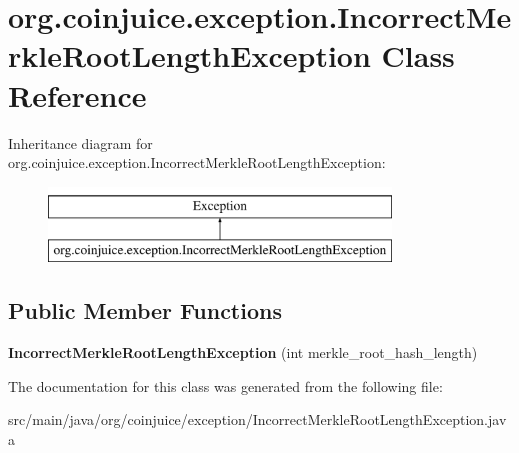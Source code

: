 \hypertarget{classorg_1_1coinjuice_1_1exception_1_1_incorrect_merkle_root_length_exception}{\section{org.\-coinjuice.\-exception.\-Incorrect\-Merkle\-Root\-Length\-Exception Class Reference}
\label{classorg_1_1coinjuice_1_1exception_1_1_incorrect_merkle_root_length_exception}
}
Inheritance diagram for org.\-coinjuice.\-exception.\-Incorrect\-Merkle\-Root\-Length\-Exception\-:\begin{figure}[H]
\begin{center}
\leavevmode
\includegraphics[height=2.000000cm]{classorg_1_1coinjuice_1_1exception_1_1_incorrect_merkle_root_length_exception}
\end{center}
\end{figure}
\subsection*{Public Member Functions}
\begin{DoxyCompactItemize}
\item 
\hypertarget{classorg_1_1coinjuice_1_1exception_1_1_incorrect_merkle_root_length_exception_afa95419d87ad29f41a06b87993b787d7}{{\bfseries Incorrect\-Merkle\-Root\-Length\-Exception} (int merkle\-\_\-root\-\_\-hash\-\_\-length)}\label{classorg_1_1coinjuice_1_1exception_1_1_incorrect_merkle_root_length_exception_afa95419d87ad29f41a06b87993b787d7}

\end{DoxyCompactItemize}


The documentation for this class was generated from the following file\-:\begin{DoxyCompactItemize}
\item 
src/main/java/org/coinjuice/exception/Incorrect\-Merkle\-Root\-Length\-Exception.\-java\end{DoxyCompactItemize}
